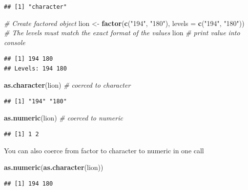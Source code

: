 \documentclass[
]{book}
\newenvironment{Shaded}{\begin{snugshade}}{\end{snugshade}}
\newcommand{\AttributeTok}[1]{\textcolor[rgb]{0.13,0.29,0.53}{#1}}
\newcommand{\CommentTok}[1]{\textcolor[rgb]{0.56,0.35,0.01}{\textit{#1}}}
\newcommand{\FunctionTok}[1]{\textcolor[rgb]{0.13,0.29,0.53}{\textbf{#1}}}
\newcommand{\NormalTok}[1]{#1}
\newcommand{\OtherTok}[1]{\textcolor[rgb]{0.56,0.35,0.01}{#1}}
\newcommand{\StringTok}[1]{\textcolor[rgb]{0.31,0.60,0.02}{#1}}
\begin{document}
\begin{verbatim}
## [1] "character"
\end{verbatim}

\begin{Shaded}
\begin{Highlighting}[]
\CommentTok{\# Create factored object}
\NormalTok{lion }\OtherTok{\textless{}{-}} \FunctionTok{factor}\NormalTok{(}\FunctionTok{c}\NormalTok{(}\StringTok{"194"}\NormalTok{, }\StringTok{"180"}\NormalTok{), }\AttributeTok{levels =} \FunctionTok{c}\NormalTok{(}\StringTok{"194"}\NormalTok{, }\StringTok{"180"}\NormalTok{)) }\CommentTok{\# The levels must match the exact format of the values}
\NormalTok{lion }\CommentTok{\# print value into console}
\end{Highlighting}
\end{Shaded}

\begin{verbatim}
## [1] 194 180
## Levels: 194 180
\end{verbatim}

\begin{Shaded}
\begin{Highlighting}[]
\FunctionTok{as.character}\NormalTok{(lion) }\CommentTok{\# coerced to character}
\end{Highlighting}
\end{Shaded}

\begin{verbatim}
## [1] "194" "180"
\end{verbatim}

\begin{Shaded}
\begin{Highlighting}[]
\FunctionTok{as.numeric}\NormalTok{(lion) }\CommentTok{\# coerced to numeric}
\end{Highlighting}
\end{Shaded}

\begin{verbatim}
## [1] 1 2
\end{verbatim}

You can also coerce from factor to character to numeric in one call

\begin{Shaded}
\begin{Highlighting}[]
\FunctionTok{as.numeric}\NormalTok{(}\FunctionTok{as.character}\NormalTok{(lion))}
\end{Highlighting}
\end{Shaded}

\begin{verbatim}
## [1] 194 180
\end{verbatim}
\end{document}
